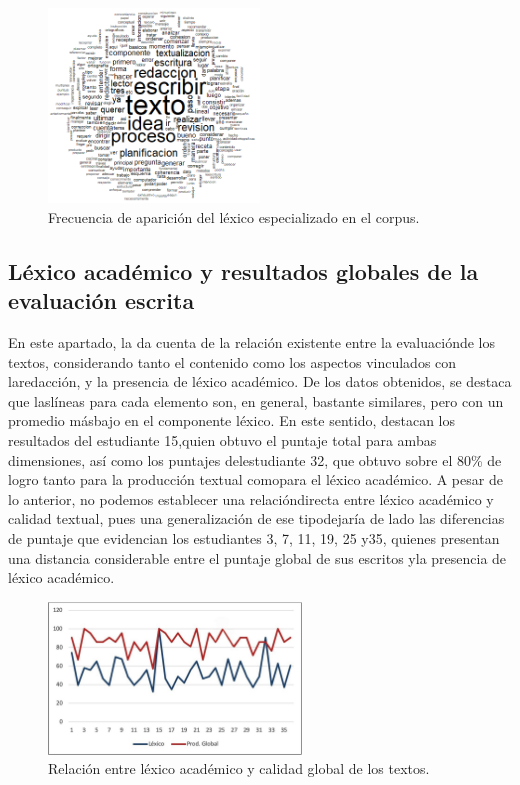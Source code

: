 \documentclass{textolivre}
\begin{document}
\begin{figure}[htbp]
 \centering
 \includegraphics[width=0.5\textwidth]{figure01.png}
 \caption{Frecuencia de aparición del léxico especializado en el corpus.}
 \label{fig01}
\end{figure}


\subsection{Léxico académico y resultados globales de la evaluación escrita}\label{sec-lex-aca-res}
En este apartado, la  da cuenta de la relación existente entre la
evaluaciónde los textos, considerando tanto el contenido como los aspectos
vinculados con laredacción, y la presencia de léxico académico. De los datos
obtenidos, se destaca que laslíneas para cada elemento son, en general,
bastante similares, pero con un promedio másbajo en el componente léxico. En
este sentido, destacan los resultados del estudiante 15,quien obtuvo el puntaje
total para ambas dimensiones, así como los puntajes delestudiante 32, que
obtuvo sobre el 80\% de logro tanto para la producción textual comopara el
léxico académico. A pesar de lo anterior, no podemos establecer una
relacióndirecta entre léxico académico y calidad textual, pues una
generalización de ese tipodejaría de lado las diferencias de puntaje que
evidencian los estudiantes 3, 7, 11, 19, 25 y35, quienes presentan una
distancia considerable entre el puntaje global de sus escritos yla presencia de
léxico académico.

\begin{figure}[htbp]
 \centering
 \includegraphics[width=0.6\textwidth]{figure02.png}
 \caption{Relación entre léxico académico y calidad global de los textos.}
 \label{fig02}
\end{figure}
\end{document}
